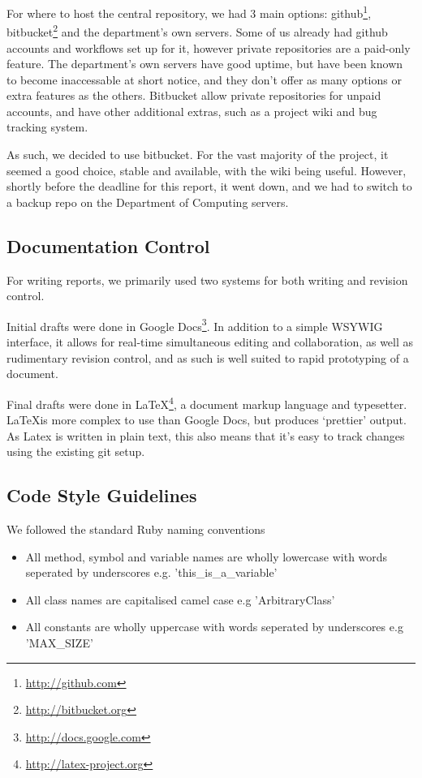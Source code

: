       For where to host the central repository, we had 3 main options: github\footnote{\url{http://github.com}}, bitbucket\footnote{\url{http://bitbucket.org}} and the department's own servers.
      Some of us already had github accounts and workflows set up for it, however private repositories are a paid-only feature.
      The department's own servers have good uptime, but have been known to become inaccessable at short notice, and they don't offer as many options or extra features as the others.
      Bitbucket allow private repositories for unpaid accounts, and have other additional extras, such as a project wiki and bug tracking system.

      As such, we decided to use bitbucket.
      For the vast majority of the project, it seemed a good choice, stable and available, with the wiki being useful.
      However, shortly before the deadline for this report, it went down, and we had to switch to a backup repo on the Department of Computing servers.

    \subsection{Documentation Control}
      For writing reports, we primarily used two systems for both writing and revision control.

      Initial drafts were done in Google Docs\footnote{\url{http://docs.google.com}}.
      In addition to a simple WSYWIG interface, it allows for real-time simultaneous editing and collaboration, as well as rudimentary revision control, and as such is well suited to rapid prototyping of a document.

      Final drafts were done in \LaTeX\footnote{\url{http://latex-project.org}}, a document markup language and typesetter.
      \LaTeX is more complex to use than Google Docs, but produces `prettier' output. As Latex is written in plain text, this also means that it's easy to track changes using the existing git setup.

  \subsection{Code Style Guidelines}
  We followed the standard Ruby naming conventions
    \begin{itemize}
      \item All method, symbol and variable names are wholly lowercase with words seperated by underscores e.g. 'this\_is\_a\_variable'
      \item All class names are capitalised camel case e.g 'ArbitraryClass'
      \item All constants are wholly uppercase with words seperated by underscores e.g 'MAX\_SIZE'
    \end{itemize}


